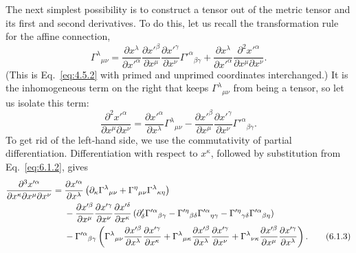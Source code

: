 The next simplest possibility is to construct a tensor out of the metric
tensor and its first and second derivatives. To do this, let us recall the
transformation rule for the affine connection,
\begin{equation}
  \Gamma^\lambda{}_{\mu\nu}
  =
  \frac{\partial x^\lambda}{\partial x'^\alpha}
  \frac{\partial x'^\beta}{\partial x^\mu}
  \frac{\partial x'^\gamma}{\partial x^\nu}
  \Gamma'^\alpha{}_{\beta\gamma}
  +
  \frac{\partial x^\lambda}{\partial x'^\alpha}
  \frac{\partial^2x'^\alpha}{\partial x^\mu\partial x^\nu}.
  \tag{6.1.1}\label{eq:6.1.1}
\end{equation}
(This is Eq.~\eqref{eq:4.5.2} with primed and unprimed coordinates
interchanged.) It is the inhomogeneous term on the right that keeps
\(\Gamma^\lambda{}_{\mu\nu}\) from being a tensor, so let us isolate this
term:
\begin{equation}
  \frac{\partial^2x'^\alpha}{\partial x^\mu\partial x^\nu}
  =
  \frac{\partial x'^\alpha}{\partial x^\lambda}
  \Gamma^\lambda{}_{\mu\nu}
  -
  \frac{\partial x'^\beta}{\partial x^\mu}
  \frac{\partial x'^\gamma}{\partial x^\nu}
  \Gamma'^\alpha{}_{\beta\gamma}.
  \tag{6.1.2}\label{eq:6.1.2}
\end{equation}
To get rid of the left-hand side, we use the commutativity of partial
differentiation. Differentiation with respect to \(x^\kappa\), followed by
substitution from Eq.~\eqref{eq:6.1.2}, gives
\begin{align}
  \frac{\partial^3x'^\alpha}
       {\partial x^\kappa\partial x^\mu\partial x^\nu}
  ={}&
  \frac{\partial x'^\alpha}{\partial x^\lambda}
  \left(
    \partial_\kappa\Gamma^\lambda{}_{\mu\nu}
    +\Gamma^\eta{}_{\mu\nu}\Gamma^\lambda{}_{\kappa\eta}
  \right)
  \notag\\
  &-
  \frac{\partial x'^\beta}{\partial x^\mu}
  \frac{\partial x'^\gamma}{\partial x^\nu}
  \frac{\partial x'^\delta}{\partial x^\kappa}
  \left(
    \partial'_\delta\Gamma'^\alpha{}_{\beta\gamma}
    -\Gamma'^\eta{}_{\beta\delta}\Gamma'^\alpha{}_{\eta\gamma}
    -\Gamma'^\eta{}_{\gamma\delta}\Gamma'^\alpha{}_{\beta\eta}
  \right)
  \notag\\
  &-
  \Gamma'^\alpha{}_{\beta\gamma}
  \left(
    \Gamma^\lambda{}_{\mu\nu}
    \frac{\partial x'^\beta}{\partial x^\lambda}
    \frac{\partial x'^\gamma}{\partial x^\kappa}
    +\Gamma^\lambda{}_{\mu\kappa}
    \frac{\partial x'^\beta}{\partial x^\lambda}
    \frac{\partial x'^\gamma}{\partial x^\nu}
    +\Gamma^\lambda{}_{\nu\kappa}
    \frac{\partial x'^\beta}{\partial x^\mu}
    \frac{\partial x'^\gamma}{\partial x^\lambda}
  \right).
  \tag{6.1.3}\label{eq:6.1.3}
\end{align}
